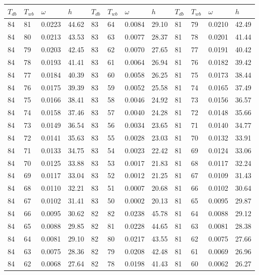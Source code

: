 \begin{tabular}{llll|llll|llll}
 \toprule 
\(T_{db}\) & \(T_{wb}\) & \(\omega\) & \(h\) & \(T_{db}\) & \(T_{wb}\) & \(\omega\) & \(h\) & \(T_{db}\) & \(T_{wb}\) & \(\omega\) & \(h\)  \\ \midrule 
84 & 81 & 0.0223 & 44.62 & 83 & 64 & 0.0084 & 29.10 & 81 & 79 & 0.0210 & 42.49\\
84 & 80 & 0.0213 & 43.53 & 83 & 63 & 0.0077 & 28.37 & 81 & 78 & 0.0201 & 41.44\\
84 & 79 & 0.0203 & 42.45 & 83 & 62 & 0.0070 & 27.65 & 81 & 77 & 0.0191 & 40.42\\
84 & 78 & 0.0193 & 41.41 & 83 & 61 & 0.0064 & 26.94 & 81 & 76 & 0.0182 & 39.42\\
84 & 77 & 0.0184 & 40.39 & 83 & 60 & 0.0058 & 26.25 & 81 & 75 & 0.0173 & 38.44\\
84 & 76 & 0.0175 & 39.39 & 83 & 59 & 0.0052 & 25.58 & 81 & 74 & 0.0165 & 37.49\\
84 & 75 & 0.0166 & 38.41 & 83 & 58 & 0.0046 & 24.92 & 81 & 73 & 0.0156 & 36.57\\
84 & 74 & 0.0158 & 37.46 & 83 & 57 & 0.0040 & 24.28 & 81 & 72 & 0.0148 & 35.66\\
84 & 73 & 0.0149 & 36.54 & 83 & 56 & 0.0034 & 23.65 & 81 & 71 & 0.0140 & 34.77\\
84 & 72 & 0.0141 & 35.63 & 83 & 55 & 0.0028 & 23.03 & 81 & 70 & 0.0132 & 33.91\\
84 & 71 & 0.0133 & 34.75 & 83 & 54 & 0.0023 & 22.42 & 81 & 69 & 0.0124 & 33.06\\
84 & 70 & 0.0125 & 33.88 & 83 & 53 & 0.0017 & 21.83 & 81 & 68 & 0.0117 & 32.24\\
84 & 69 & 0.0117 & 33.04 & 83 & 52 & 0.0012 & 21.25 & 81 & 67 & 0.0109 & 31.43\\
84 & 68 & 0.0110 & 32.21 & 83 & 51 & 0.0007 & 20.68 & 81 & 66 & 0.0102 & 30.64\\
84 & 67 & 0.0102 & 31.41 & 83 & 50 & 0.0002 & 20.13 & 81 & 65 & 0.0095 & 29.87\\
84 & 66 & 0.0095 & 30.62 & 82 & 82 & 0.0238 & 45.78 & 81 & 64 & 0.0088 & 29.12\\
84 & 65 & 0.0088 & 29.85 & 82 & 81 & 0.0228 & 44.65 & 81 & 63 & 0.0081 & 28.38\\
84 & 64 & 0.0081 & 29.10 & 82 & 80 & 0.0217 & 43.55 & 81 & 62 & 0.0075 & 27.66\\
84 & 63 & 0.0075 & 28.36 & 82 & 79 & 0.0208 & 42.48 & 81 & 61 & 0.0069 & 26.96\\
84 & 62 & 0.0068 & 27.64 & 82 & 78 & 0.0198 & 41.43 & 81 & 60 & 0.0062 & 26.27\\

\end{tabular}
